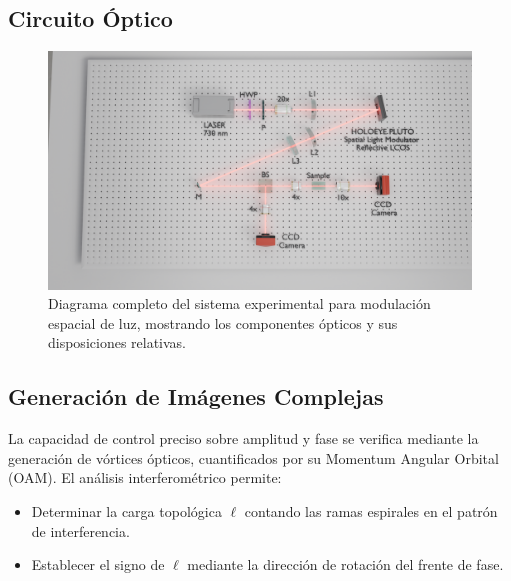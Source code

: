 \subsection{Circuito Óptico}
\begin{figure}[H]
	\centering
	\includegraphics[width=0.8\linewidth, trim={21cm 5cm 7cm 5cm}, clip]{media/SLM_setupv1}
	\caption[Diagrama del sistema de modulación espacial de luz]{Diagrama completo del sistema experimental para modulación espacial de luz, mostrando los componentes ópticos y sus disposiciones relativas.}
	\label{fig:SLM_setup}
\end{figure}

\subsection{Generación de Imágenes Complejas \label{cap:oam}}
La capacidad de control preciso sobre amplitud y fase se verifica mediante la generación de vórtices ópticos, cuantificados por su Momentum Angular Orbital (OAM). El análisis interferométrico permite:
\begin{itemize}
	\item Determinar la carga topológica $\ell$ contando las ramas espirales en el patrón de interferencia.
	\item Establecer el signo de $\ell$ mediante la dirección de rotación del frente de fase.
\end{itemize}

